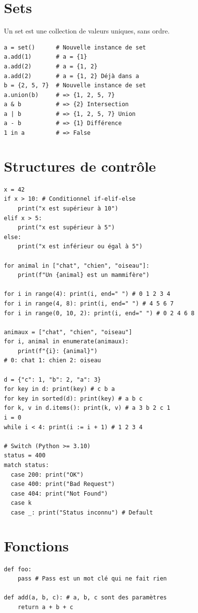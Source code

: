 \documentclass{article}
\begin{document}
\begin{multicols*}{4}
\section*{Sets}
Un set est une collection de valeurs uniques, sans ordre.
\begin{lstlisting}
a = set()      # Nouvelle instance de set
a.add(1)       # a = {1}
a.add(2)       # a = {1, 2}
a.add(2)       # a = {1, 2} Déjà dans a
b = {2, 5, 7}  # Nouvelle instance de set
a.union(b)     # => {1, 2, 5, 7}
a & b          # => {2} Intersection
a | b          # => {1, 2, 5, 7} Union
a - b          # => {1} Différence
1 in a         # => False
\end{lstlisting}

\section*{Structures de contrôle}
\begin{lstlisting}
x = 42
if x > 10: # Conditionnel if-elif-else
    print("x est supérieur à 10")
elif x > 5:
    print("x est supérieur à 5")
else:
    print("x est inférieur ou égal à 5")

for animal in ["chat", "chien", "oiseau"]:
    print(f"Un {animal} est un mammifère")

for i in range(4): print(i, end=" ") # 0 1 2 3 4
for i in range(4, 8): print(i, end=" ") # 4 5 6 7
for i in range(0, 10, 2): print(i, end=" ") # 0 2 4 6 8

animaux = ["chat", "chien", "oiseau"]
for i, animal in enumerate(animaux):
    print(f"{i}: {animal}")
# 0: chat 1: chien 2: oiseau

d = {"c": 1, "b": 2, "a": 3}
for key in d: print(key) # c b a
for key in sorted(d): print(key) # a b c
for k, v in d.items(): print(k, v) # a 3 b 2 c 1
i = 0
while i < 4: print(i := i + 1) # 1 2 3 4
  
# Switch (Python >= 3.10)
status = 400
match status:
  case 200: print("OK")
  case 400: print("Bad Request")  
  case 404: print("Not Found")
  case k 
  case _: print("Status inconnu") # Default      
\end{lstlisting}

\section*{Fonctions}
\begin{lstlisting}
def foo: 
    pass # Pass est un mot clé qui ne fait rien

def add(a, b, c): # a, b, c sont des paramètres
    return a + b + c


\end{lstlisting}
\end{multicols*}
\end{document}
